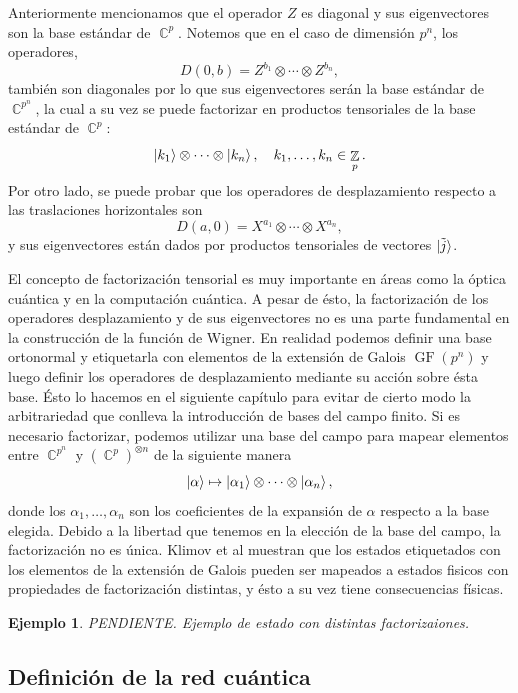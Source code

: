 \documentclass[a4paper]{report}
\DeclareMathOperator{\C}{\mathbb{C}}
\DeclareMathOperator{\Z}{\mathbb{Z}}
\DeclareMathOperator{\GF}{GF}
\newtheorem{example}{Ejemplo}
\begin{document}
  Anteriormente mencionamos que el operador $Z$ es diagonal
  y sus eigenvectores son la base estándar de $\C^{p}$.
  Notemos que en el caso de dimensión $p^{n}$, los
  operadores, 
  \[
    D(0,b) = Z^{b_1} \otimes \cdots \otimes Z^{b_n},
  \] 
  también son diagonales por lo que sus eigenvectores serán
  la base estándar de $\C^{p^{n}}$, la cual a su vez se
  puede factorizar en productos tensoriales de la base
  estándar de $\C^{p}$:
  \[
    \ket{k_1} \otimes \cdots \otimes \ket{k_n},
    \quad k_1,\ldots,k_n \in \Z_p.
  \] 
  Por otro lado, se puede probar que los operadores de
  desplazamiento respecto a las traslaciones horizontales
  son
  \[
    D(a,0) = X^{a_1} \otimes \cdots \otimes X^{a_n},
  \] 
  y sus eigenvectores están dados por productos tensoriales
  de vectores $\ket{\tilde j}$.

  El concepto de factorización tensorial es muy importante
  en áreas como la óptica cuántica y en la computación
  cuántica. A pesar de ésto, la factorización de los
  operadores desplazamiento y de sus eigenvectores no es una
  parte fundamental en la construcción de la función de
  Wigner. En realidad podemos definir una base ortonormal y
  etiquetarla con elementos de la extensión de Galois
  $\GF\left(p^{n}\right)$ y luego definir los operadores de
  desplazamiento mediante su acción sobre ésta base. Ésto lo
  hacemos en el siguiente capítulo para evitar de cierto
  modo la arbitrariedad que conlleva la introducción de
  bases del campo finito. Si es necesario factorizar,
  podemos utilizar una base del campo para mapear elementos
  entre $\C^{p^{n}}$ y $\left(\C^{p}\right)^{\otimes n}$ de
  la siguiente manera
  \[
    \ket \alpha
    \mapsto \ket{\alpha_1} \otimes \cdots \otimes
    \ket{\alpha_n},
  \] 
  donde los $\alpha_1,\ldots,\alpha_n$ son los coeficientes
  de la expansión de $\alpha$ respecto a la base elegida.
  Debido a la libertad que tenemos en la elección de la base
  del campo, la factorización no es única. Klimov et al
  \cite{bjork2008} muestran que los estados etiquetados con
  los elementos de la extensión de Galois pueden ser
  mapeados a estados fisicos con propiedades de
  factorización distintas, y ésto a su vez tiene
  consecuencias físicas.
  \begin{example}
    PENDIENTE. Ejemplo de estado con distintas factorizaiones.
  \end{example}

  \subsection{Definición de la red cuántica}
\end{document}
